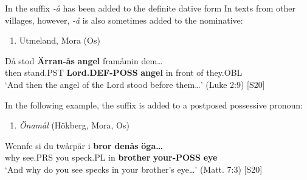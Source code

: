 In  the suffix\textit{ {}-å} has been added to the definite dative form In texts from other villages, however,\textit{ {}-å} is also sometimes added to the nominative:

\begin{enumerate} %
\item 
Utmeland, Mora (Os)

\end{enumerate} %
\ea\label{}
\gll Då  stod  \textbf{Ärran-ås}\textbf{  angel} framåmin  dem…\\


then  stand.PST  \textbf{Lord.DEF-POSS} \textbf{angel} in front of  they.OBL\\ %


‘And then the angel of the Lord stood before them…’ (Luke 2:9) [S20]
\z

In the following example, the suffix is added to a postposed possessive pronoun:

\begin{enumerate} %
\item 
\textit{Önamål} (Hökberg, Mora, Os)
\end{enumerate} %
\ea\label{}
\gll Wennfe  si  du  twårpär  i  \textbf{bror}\textbf{  denås}\textbf{  öga…}\\


why  see.PRS  you  speck.PL  in  \textbf{brother} \textbf{your-POSS} \textbf{eye}\\ %


‘And why do you see specks in your brother’s eye…’ (Matt. 7:3) [S20]
\z

